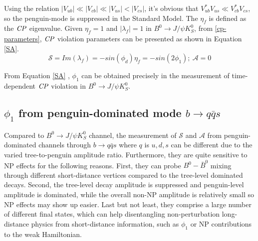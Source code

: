 Using the relation $|V_{ub}|\ll |V_{cb}|\ll|V_{us}|<|V_{cs}|$, it's obvious that $V^*_{ub}V_{us} \ll V^*_{cb}V_{cs}$, so the penguin-mode is suppressed in the Standard Model. The $\eta_f$ is defined as the $\it{CP}$ eigenvalue. Given $\eta_f=1$ and $|\lambda_f|=1$ in $B^0 \to J/\psi K^0_S$, from \ref{cp-parameters}, $\it{CP}$ violation parameters can be presented as shown in Equation \ref{SA}.
\begin{equation}\label{SA}
\mathcal{S} = Im(\lambda_f)
=-sin(\phi_d)\eta_f=-sin(2\phi_1) ; \: \mathcal{A} = 0
\end{equation}

From Equation \ref{SA} , $\phi_1$ can be obtained precisely in the measurement of time-dependent $\it{CP}$ violation in $B^0 \to J/\psi K^0_S$.
\begin{comment}
In the $b\to q\bar{q}s$ process where flavor $q$ is not charm, similar to the discussion above, we can extract $\phi_1$ using the same method. Moreover, it provides a penguin-dominated process which is sensitive to the contribution of New Physics, which includes the $B^0_d\to K^0_S K^0_S K^0_S$ decay. In the next section, it's clear that such decay process is important to provide additional insight in seeking the effect beyond the SM (BSM contribution).
\end{comment}



\subsection{$\phi_1$ from penguin-dominated mode $b\to q\bar{q}s$}
Compared to $B^0 \to J/\psi K^0_S$ channel, the measurement of $\mathcal{S}$ and $\mathcal{A}$ from penguin-dominated channels through $b \to q\bar{q}s$ where $q$ is $u,d,s$ can be different due to the varied tree-to-penguin amplitude ratio. Furthermore, they are quite sensitive to NP effects for the following reasons\cite{b2book}. First, they can probe $B^0-\bar{B}^0$ mixing through different short-distance vertices compared to the tree-level dominated decays. Second, the tree-level decay amplitude is suppressed and penguin-level amplitude is dominated, while the overall non-NP amplitude is relatively small so NP effects may show up easier. Last but not least, they comprise a large number of different final states, which can help disentangling non-perturbation long-distance physics from short-distance information, such as $\phi_1$ or NP contributions to the weak Hamiltonian. 

